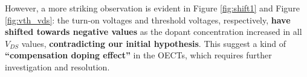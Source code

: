 However, a more striking observation is evident in Figure \ref{fig:shift1} and Figure \ref{fig:vth_vds}: the turn-on voltages and threshold voltages, respectively, \textbf{have shifted towards negative values} as the dopant concentration increased in all $V_{DS}$ values, \textbf{contradicting our initial hypothesis}. This suggest a kind of \textbf{``compensation doping effect''} in the OECTs, which requires further investigation and resolution. %

\begin{figure}[ht]
    \centering
    \qquad

\end{figure}
